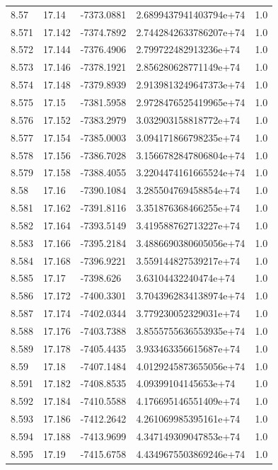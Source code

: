\begin{tabular}{lllll}
8.57 & 17.14 & -7373.0881 & 2.6899437941403794e+74 & 1.0 \\
8.571 & 17.142 & -7374.7892 & 2.7442842633786207e+74 & 1.0 \\
8.572 & 17.144 & -7376.4906 & 2.799722482913236e+74 & 1.0 \\
8.573 & 17.146 & -7378.1921 & 2.856280628771149e+74 & 1.0 \\
8.574 & 17.148 & -7379.8939 & 2.9139813249647373e+74 & 1.0 \\
8.575 & 17.15 & -7381.5958 & 2.9728476525419965e+74 & 1.0 \\
8.576 & 17.152 & -7383.2979 & 3.032903158818772e+74 & 1.0 \\
8.577 & 17.154 & -7385.0003 & 3.094171866798235e+74 & 1.0 \\
8.578 & 17.156 & -7386.7028 & 3.1566782847806804e+74 & 1.0 \\
8.579 & 17.158 & -7388.4055 & 3.2204474161665524e+74 & 1.0 \\
8.58 & 17.16 & -7390.1084 & 3.285504769458854e+74 & 1.0 \\
8.581 & 17.162 & -7391.8116 & 3.351876368466255e+74 & 1.0 \\
8.582 & 17.164 & -7393.5149 & 3.419588762713227e+74 & 1.0 \\
8.583 & 17.166 & -7395.2184 & 3.4886690380605056e+74 & 1.0 \\
8.584 & 17.168 & -7396.9221 & 3.559144827539217e+74 & 1.0 \\
8.585 & 17.17 & -7398.626 & 3.63104432240474e+74 & 1.0 \\
8.586 & 17.172 & -7400.3301 & 3.7043962834138974e+74 & 1.0 \\
8.587 & 17.174 & -7402.0344 & 3.779230052329031e+74 & 1.0 \\
8.588 & 17.176 & -7403.7388 & 3.8555755636553935e+74 & 1.0 \\
8.589 & 17.178 & -7405.4435 & 3.933463356615687e+74 & 1.0 \\
8.59 & 17.18 & -7407.1484 & 4.0129245873655056e+74 & 1.0 \\
8.591 & 17.182 & -7408.8535 & 4.09399104145653e+74 & 1.0 \\
8.592 & 17.184 & -7410.5588 & 4.176695146551409e+74 & 1.0 \\
8.593 & 17.186 & -7412.2642 & 4.261069985395161e+74 & 1.0 \\
8.594 & 17.188 & -7413.9699 & 4.347149309047853e+74 & 1.0 \\
8.595 & 17.19 & -7415.6758 & 4.4349675503869246e+74 & 1.0 \\

\end{tabular}

